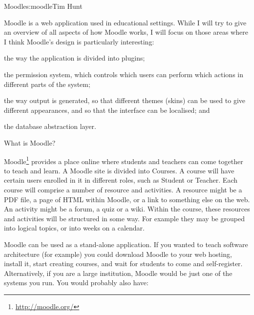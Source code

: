 \begin{aosachapter}{Moodle}{s:moodle}{Tim Hunt}

Moodle is a web application used in educational settings. While I will
try to give an overview of all aspects of how Moodle works, I will
focus on those areas where I think Moodle's design is particularly
interesting:

\begin{aosaenumerate}

\item the way the application is divided into plugins;

\item the permission system, which controls which users can perform
  which actions in different parts of the system;

\item the way output is generated, so that different themes (skins)
  can be used to give different appearances, and so that the interface
  can be localised; and

\item the database abstraction layer.

\end{aosaenumerate}

\begin{aosasect1}{What is Moodle?}

Moodle\footnote{\url{http://moodle.org/}} provides a place online
where students and teachers can come together to teach and learn. A
Moodle site is divided into Courses. A course will have certain users
enrolled in it in different roles, such as Student or Teacher. Each
course will comprise a number of resource and activities. A resource
might be a PDF file, a page of HTML within Moodle, or a link to
something else on the web. An activity might be a forum, a quiz or a
wiki. Within the course, these resources and activities will be
structured in some way. For example they may be grouped into logical
topics, or into weeks on a calendar.


Moodle can be used as a stand-alone application. If you wanted to
teach software architecture (for example) you could download Moodle to
your web hosting, install it, start creating courses, and wait for
students to come and self-register. Alternatively, if you are a large
institution, Moodle would be just one of the systems you run. You
would probably also have:



\end{aosasect1}
\end{aosachapter}
